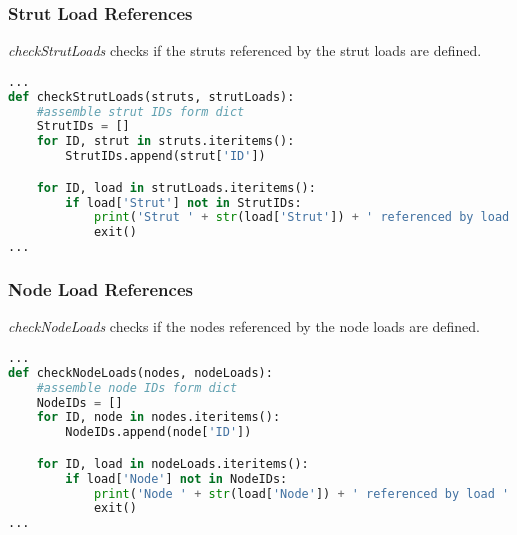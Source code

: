 \pagebreak

\subsubsection{Strut Load References}
\label{sec:inputcheck-checkStrutLoads}

\textit{checkStrutLoads} checks if the struts referenced by the strut loads are defined.

\begin{inconsolata}
\begin{minipage}{\linewidth}
\begin{lstlisting}[language=python]
...
def checkStrutLoads(struts, strutLoads):
    #assemble strut IDs form dict
    StrutIDs = []
    for ID, strut in struts.iteritems():
        StrutIDs.append(strut['ID'])

    for ID, load in strutLoads.iteritems():
        if load['Strut'] not in StrutIDs:
            print('Strut ' + str(load['Strut']) + ' referenced by load ' + str(ID) + ' but not defined.')
            exit()
...
\end{lstlisting}
\end{minipage}
\end{inconsolata}

\subsubsection{Node Load References}
\label{sec:inputcheck-checkNodeLoads}

\textit{checkNodeLoads} checks if the nodes referenced by the node loads are defined.

\begin{inconsolata}
\begin{minipage}{\linewidth}
\begin{lstlisting}[language=python]
...
def checkNodeLoads(nodes, nodeLoads):
    #assemble node IDs form dict
    NodeIDs = []
    for ID, node in nodes.iteritems():
        NodeIDs.append(node['ID'])

    for ID, load in nodeLoads.iteritems():
        if load['Node'] not in NodeIDs:
            print('Node ' + str(load['Node']) + ' referenced by load ' + str(ID) + ' but not defined.')
            exit()
...
\end{lstlisting}
\end{minipage}
\end{inconsolata}

